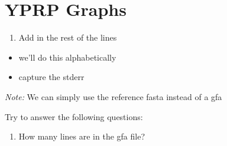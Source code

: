 \documentclass[
]{book}
\newenvironment{Shaded}{\begin{snugshade}}{\end{snugshade}}
\newcommand{\AttributeTok}[1]{\textcolor[rgb]{0.77,0.63,0.00}{#1}}
\newcommand{\DecValTok}[1]{\textcolor[rgb]{0.00,0.00,0.81}{#1}}
\newcommand{\ExtensionTok}[1]{#1}
\newcommand{\FunctionTok}[1]{\textcolor[rgb]{0.00,0.00,0.00}{#1}}
\newcommand{\KeywordTok}[1]{\textcolor[rgb]{0.13,0.29,0.53}{\textbf{#1}}}
\newcommand{\NormalTok}[1]{#1}
\newcommand{\OperatorTok}[1]{\textcolor[rgb]{0.81,0.36,0.00}{\textbf{#1}}}
\newcommand{\PreprocessorTok}[1]{\textcolor[rgb]{0.56,0.35,0.01}{\textit{#1}}}
\newcommand{\VariableTok}[1]{\textcolor[rgb]{0.00,0.00,0.00}{#1}}
\providecommand{\tightlist}{%
  \setlength{\itemsep}{0pt}\setlength{\parskip}{0pt}}
\begin{document}
\hypertarget{yprp-graphs}{%
\section{YPRP Graphs}\label{yprp-graphs}}

\begin{enumerate}
\def\labelenumi{\arabic{enumi}.}
\tightlist
\item
  Add in the rest of the lines
\end{enumerate}

\begin{itemize}
\tightlist
\item
  we'll do this alphabetically
\item
  capture the stderr
\end{itemize}

\begin{Shaded}
\end{Shaded}

\emph{Note:} We can simply use the reference fasta instead of a gfa

\begin{Shaded}
\end{Shaded}

Try to answer the following questions:

\begin{enumerate}
\def\labelenumi{\arabic{enumi}.}
\tightlist
\item
  How many lines are in the gfa file?
\end{enumerate}
\end{document}
